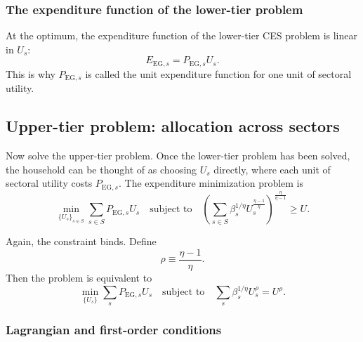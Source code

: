 \documentclass[11pt]{article}
\begin{document}
\subsubsection{The expenditure function of the lower-tier problem}

At the optimum, the expenditure function of the lower-tier CES problem is linear in \(U_s\):
\begin{equation}
E_{\mathrm{EG},s} = P_{\mathrm{EG},s}U_s.
\end{equation}
This is why \(P_{\mathrm{EG},s}\) is called the unit expenditure function for one unit of sectoral utility.

\subsection{Upper-tier problem: allocation across sectors}

Now solve the upper-tier problem. Once the lower-tier problem has been solved, the household can be thought of as choosing \(U_s\) directly, where each unit of sectoral utility costs \(P_{\mathrm{EG},s}\). The expenditure minimization problem is
\begin{equation}
\min_{\{U_s\}_{s\in S}} \sum_{s\in S} P_{\mathrm{EG},s}U_s
\quad\text{subject to}\quad
\left(\sum_{s\in S}\beta_s^{1/\eta}U_s^{\frac{\eta-1}{\eta}}\right)^{\frac{\eta}{\eta-1}}\ge U.
\end{equation}

Again, the constraint binds. Define
\begin{equation}
\rho \equiv \frac{\eta-1}{\eta}.
\end{equation}
Then the problem is equivalent to
\begin{equation}
\min_{\{U_s\}} \sum_s P_{\mathrm{EG},s}U_s
\quad\text{subject to}\quad
\sum_s \beta_s^{1/\eta}U_s^{\rho}=U^{\rho}.
\end{equation}

\subsubsection{Lagrangian and first-order conditions}
\end{document}
